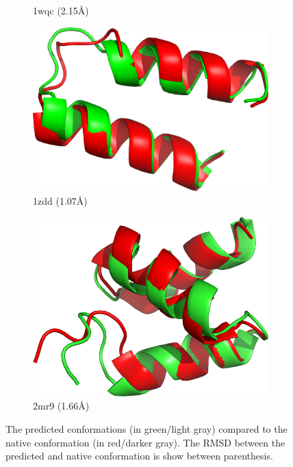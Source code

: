 \begin{figure}
\begin{subfigure}{0.32\linewidth}
    \caption{1wqc (2.15\AA)}
    \label{fig:1wqc-conformation}
  \end{subfigure}
%
  \begin{subfigure}{0.32\linewidth}
    \centering
    \includegraphics[width=0.9\linewidth]{Figuras/prots/1zdd_render.png}
    \caption{1zdd (1.07\AA)}
    \label{fig:1zdd-conformation}
  \end{subfigure}
%
  \begin{subfigure}{0.32\linewidth}
    \centering
    \includegraphics[width=0.9\linewidth]{Figuras/prots/2mr9_render.png}
    \caption{2mr9 (1.66\AA)}
    \label{fig:2mr9-conformation}
  \end{subfigure}
  \caption{The predicted conformations (in green/light gray) compared to the
  native conformation (in red/darker gray). The RMSD between the predicted and
  native conformation is show between parenthesis.}
  \label{fig:all-conformations}
\end{figure}
